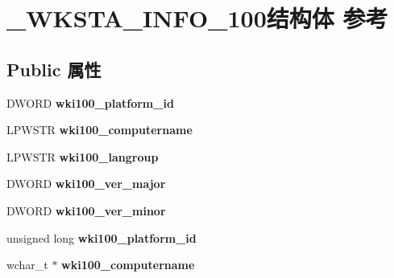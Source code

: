 \hypertarget{struct___w_k_s_t_a___i_n_f_o__100}{}\section{\+\_\+\+W\+K\+S\+T\+A\+\_\+\+I\+N\+F\+O\+\_\+100结构体 参考}
\label{struct___w_k_s_t_a___i_n_f_o__100}
\subsection*{Public 属性}
\begin{DoxyCompactItemize}
\item 
\mbox{\label{struct___w_k_s_t_a___i_n_f_o__100_ade84925ba309cdfef5daf77eed274868}} 
D\+W\+O\+RD {\bfseries wki100\+\_\+platform\+\_\+id}
\item 
\mbox{\label{struct___w_k_s_t_a___i_n_f_o__100_abfdf024a4d1c0db61e7458408ba7285f}} 
L\+P\+W\+S\+TR {\bfseries wki100\+\_\+computername}
\item 
\mbox{\label{struct___w_k_s_t_a___i_n_f_o__100_a6096e405353357f9ea61523e5c3f82c3}} 
L\+P\+W\+S\+TR {\bfseries wki100\+\_\+langroup}
\item 
\mbox{\label{struct___w_k_s_t_a___i_n_f_o__100_a5ffe5fb7f3488e6ff768434dfd19fdcf}} 
D\+W\+O\+RD {\bfseries wki100\+\_\+ver\+\_\+major}
\item 
\mbox{\label{struct___w_k_s_t_a___i_n_f_o__100_a699dc1a540e1ae5eff20458922e156eb}} 
D\+W\+O\+RD {\bfseries wki100\+\_\+ver\+\_\+minor}
\item 
\mbox{\label{struct___w_k_s_t_a___i_n_f_o__100_aefad5c4421352332802de4323d019956}} 
unsigned long {\bfseries wki100\+\_\+platform\+\_\+id}
\item 
\mbox{\label{struct___w_k_s_t_a___i_n_f_o__100_a5bb233bf4039316094a6fd77f0734659}} 
wchar\+\_\+t $\ast$ {\bfseries wki100\+\_\+computername}
\item 
\mbox{\label{struct___w_k_s_t_a___i_n_f_o__100_a2eab5f61443920b10ec7f91a9f2edd0d}} 

\end{DoxyCompactItemize}
